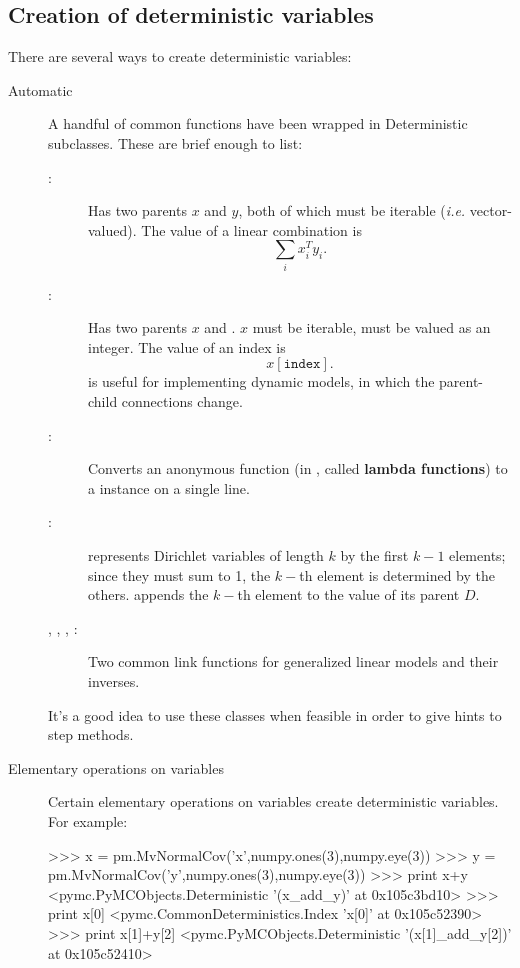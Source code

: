 \documentclass[]{jss}
\begin{document}
\subsection{Creation of deterministic variables}
There are several ways to create deterministic variables:
\begin{description}
   \item[Automatic] A handful of common functions have been wrapped in Deterministic subclasses. These are brief enough to list:
   \begin{description}
      \item[:] Has two parents $x$ and $y$, both of which must be iterable (\emph{i.e.} vector-valued). The value of a linear combination is
      \[
      \sum_i x_i^T y_i.
      \]
      \item[:] Has two parents $x$ and . $x$ must be iterable,  must be valued as an integer. The value of an index is
      \[
      x[\mathtt{index}].
      \]
       is useful for implementing dynamic models, in which the parent-child connections change.
      \item[:] Converts an anonymous function (in , called \textbf{lambda functions}) to a  instance on a single line.
      \item[:]  represents Dirichlet variables of length $k$ by the first $k-1$ elements; since they must sum to 1, the $k-$th element is determined by the others.  appends the $k-$th element to the value of its parent $D$.
      \item[, , , :] Two common link functions for generalized linear models and their inverses.
   \end{description}
   It's a good idea to use these classes when feasible in order to give hints to step methods.

   \item[Elementary operations on variables] Certain elementary operations on variables create deterministic variables. For example:   
\begin{CodeInput}
>>> x = pm.MvNormalCov('x',numpy.ones(3),numpy.eye(3))
>>> y = pm.MvNormalCov('y',numpy.ones(3),numpy.eye(3))
>>> print x+y
<pymc.PyMCObjects.Deterministic '(x_add_y)' at 0x105c3bd10>
>>> print x[0]
<pymc.CommonDeterministics.Index 'x[0]' at 0x105c52390>
>>> print x[1]+y[2]
<pymc.PyMCObjects.Deterministic '(x[1]_add_y[2])' at 0x105c52410>
\end{CodeInput}


\end{description}
\end{document}
